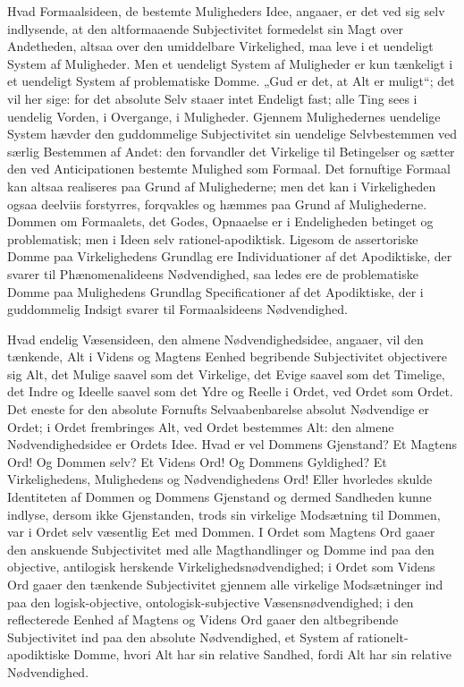 \documentclass[12pt]{book}
\newcommand{\opage}[1]{\marginnote{\footnotesize\textit{[#1]}}}
\begin{document}
Hvad Formaalsideen, de bestemte Muligheders Idee, angaaer,
er det ved sig selv indlysende, at den altformaaende
Subjectivitet formedelst sin Magt over Andetheden, altsaa
over den umiddelbare Virkelighed, maa leve i et uendeligt
System af Muligheder. Men et uendeligt System af Muligheder
er kun tænkeligt i et uendeligt System af problematiske
Domme. „Gud er det, at Alt er muligt“; det vil
her sige: for det absolute Selv staaer intet Endeligt fast;
alle Ting sees i uendelig Vorden, i Overgange, i Muligheder.
Gjennem Mulighedernes uendelige System hævder den guddommelige
Subjectivitet sin uendelige Selvbestemmen ved
særlig Bestemmen af Andet: den forvandler det Virkelige til
Betingelser og sætter den ved Anticipationen bestemte Mulighed
som Formaal. Det fornuftige Formaal kan altsaa realiseres
paa Grund af Mulighederne; men det kan i Virkeligheden
ogsaa deelviis forstyrres, forqvakles og hæmmes paa
Grund af Mulighederne. Dommen om Formaalets, det Godes,
Opnaaelse er i Endeligheden betinget og problematisk; men i
Ideen selv rationel-apodiktisk. Ligesom de assertoriske Domme
paa Virkelighedens Grundlag ere Individuationer af det Apodiktiske,
der svarer til Phænomenalideens Nødvendighed, saa%
\opage{281}ledes ere de problematiske Domme paa Mulighedens Grundlag
Specificationer af det Apodiktiske, der i guddommelig Indsigt
svarer til Formaalsideens Nødvendighed.

Hvad endelig Væsensideen, den almene Nødvendighedsidee,
angaaer, vil den tænkende, Alt i Videns og Magtens
Eenhed begribende Subjectivitet objectivere sig Alt, det Mulige
saavel som det Virkelige, det Evige saavel som det Timelige,
det Indre og Ideelle saavel som det Ydre og Reelle i Ordet,
ved Ordet som Ordet. Det eneste for den absolute Fornufts
Selvaabenbarelse absolut Nødvendige er Ordet; i Ordet frembringes
Alt, ved Ordet bestemmes Alt: den almene Nødvendighedsidee
er Ordets Idee. Hvad er vel Dommens Gjenstand?
Et Magtens Ord! Og Dommen selv? Et Videns
Ord! Og Dommens Gyldighed? Et Virkelighedens, Mulighedens
og Nødvendighedens Ord! Eller hvorledes skulde Identiteten
af Dommen og Dommens Gjenstand og dermed Sandheden
kunne indlyse, dersom ikke Gjenstanden, trods sin virkelige
Modsætning til Dommen, var i Ordet selv væsentlig
Eet med Dommen. I Ordet som Magtens Ord gaaer den
anskuende Subjectivitet med alle Magthandlinger og Domme
ind paa den objective, antilogisk herskende Virkelighedsnødvendighed;
i Ordet som Videns Ord gaaer den tænkende Subjectivitet
gjennem alle virkelige Modsætninger ind paa den
logisk-objective, ontologisk-subjective Væsensnødvendighed; i den
reflecterede Eenhed af Magtens og Videns Ord gaaer den
altbegribende Subjectivitet ind paa den absolute Nødvendighed,
et System af rationelt-apodiktiske Domme, hvori Alt har sin
relative Sandhed, fordi Alt har sin relative Nødvendighed.
\end{document}
